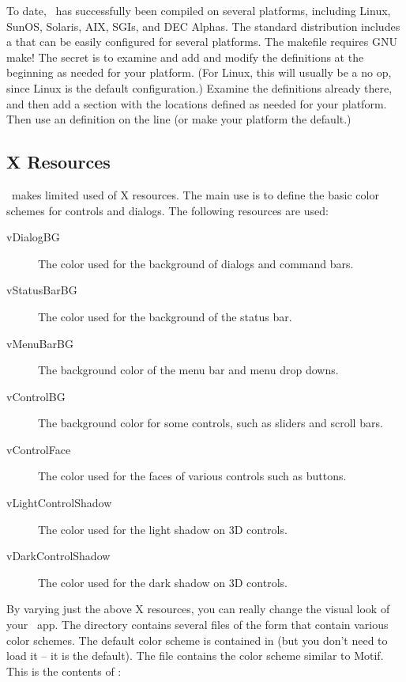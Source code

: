 To date, \V\ has successfully been compiled on several platforms,
including Linux, SunOS, Solaris, AIX, SGIs, and DEC Alphas. The standard distribution
includes a 
that can be easily configured for several platforms. The makefile requires
GNU make! The secret is to examine  and add and modify
the definitions at the beginning as needed for your platform. (For Linux,
this will usually be a no op, since Linux is the default configuration.)
Examine the definitions already there, and then add a section with
the locations defined as needed for your platform. Then use an 
definition on the  line (or make your platform the default.)

\subsection*{X Resources}

\V\ makes limited used of X resources. The main use is to define
the basic color schemes for controls and dialogs. The following
resources are used:

\begin{description}

\item[vDialogBG] The color used for the background of dialogs and
command bars.

\item[vStatusBarBG] The color used for the background of the status
bar.

\item[vMenuBarBG] The background color of the menu bar and menu drop
downs.

\item[vControlBG] The background color for some controls, such as
sliders and scroll bars.

\item[vControlFace] The color used for the faces of various
controls such as buttons.

\item[vLightControlShadow] The color used for the light shadow
on 3D controls.

\item[vDarkControlShadow] The color used for the dark shadow on
3D controls.

\end{description}

By varying just the above X resources, you can really change
the visual look of your \V\ app.
The  directory contains several files of the
form  that contain various color schemes.
The default color scheme is contained in 
(but you don't need to load it -- it is the default).
The file  contains the color scheme similar
to Motif. This is the contents of :

